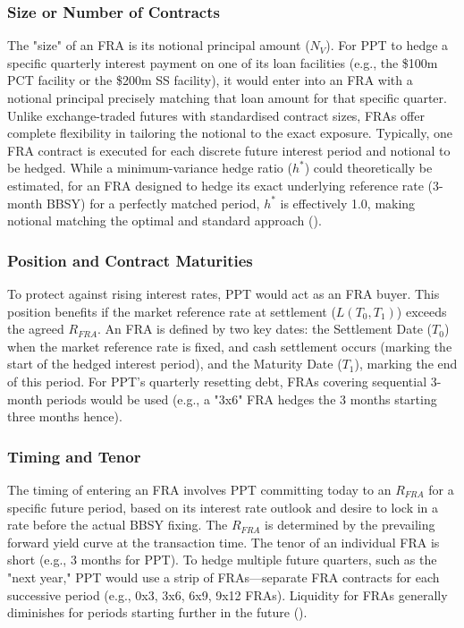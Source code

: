 \documentclass[11pt, a4paper, british]{article}
\begin{document}
\subsubsection{Size or Number of Contracts}
The "size" of an FRA is its notional principal amount ($N_V$). For PPT to hedge a specific quarterly interest payment on one of its loan facilities (e.g., the \$100m PCT facility or the \$200m SS facility), it would enter into an FRA with a notional principal precisely matching that loan amount for that specific quarter. Unlike exchange-traded futures with standardised contract sizes, FRAs offer complete flexibility in tailoring the notional to the exact exposure. Typically, one FRA contract is executed for each discrete future interest period and notional to be hedged. While a minimum-variance hedge ratio ($h^*$) could theoretically be estimated, for an FRA designed to hedge its exact underlying reference rate (3-month BBSY) for a perfectly matched period, $h^*$ is effectively 1.0, making notional matching the optimal and standard approach (\cite{lt}).

\subsubsection{Position and Contract Maturities}
To protect against rising interest rates, PPT would act as an FRA buyer. This position benefits if the market reference rate at settlement ($L(T_0, T_1)$) exceeds the agreed $R_{FRA}$. An FRA is defined by two key dates: the Settlement Date ($T_0$) when the market reference rate is fixed, and cash settlement occurs (marking the start of the hedged interest period), and the Maturity Date ($T_1$), marking the end of this period. For PPT's quarterly resetting debt, FRAs covering sequential 3-month periods would be used (e.g., a "3x6" FRA hedges the 3 months starting three months hence).

\subsubsection{Timing and Tenor}
The timing of entering an FRA involves PPT committing today to an $R_{FRA}$ for a specific future period, based on its interest rate outlook and desire to lock in a rate before the actual BBSY fixing. The $R_{FRA}$ is determined by the prevailing forward yield curve at the transaction time. The tenor of an individual FRA is short (e.g., 3 months for PPT). To hedge multiple future quarters, such as the "next year," PPT would use a strip of FRAs—separate FRA contracts for each successive period (e.g., 0x3, 3x6, 6x9, 9x12 FRAs). Liquidity for FRAs generally diminishes for periods starting further in the future (\cite{fjlsz}).
\end{document}
